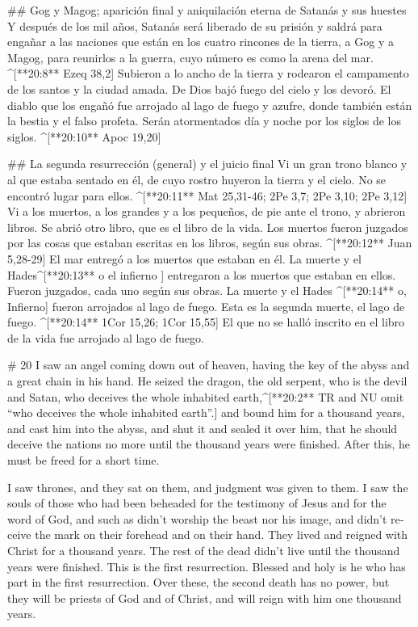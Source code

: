 \begin{paracols}{2}
## Gog y Magog; aparición final y aniquilación eterna de Satanás y sus huestes
 Y después de los mil años, Satanás será liberado de su prisión  y saldrá para engañar a las naciones que están en los cuatro rincones de la tierra, a Gog y a Magog, para reunirlos a la guerra, cuyo número es como la arena del mar. ^[**20:8** Ezeq 38,2]  Subieron a lo ancho de la tierra y rodearon el campamento de los santos y la ciudad amada. De Dios bajó fuego del cielo y los devoró.  El diablo que los engañó fue arrojado al lago de fuego y azufre, donde también están la bestia y el falso profeta. Serán atormentados día y noche por los siglos de los siglos. ^[**20:10** Apoc 19,20]

## La segunda resurrección (general) y el juicio final
 Vi un gran trono blanco y al que estaba sentado en él, de cuyo rostro huyeron la tierra y el cielo. No se encontró lugar para ellos. ^[**20:11** Mat 25,31-46; 2Pe 3,7; 2Pe 3,10; 2Pe 3,12]  Vi a los muertos, a los grandes y a los pequeños, de pie ante el trono, y abrieron libros. Se abrió otro libro, que es el libro de la vida. Los muertos fueron juzgados por las cosas que estaban escritas en los libros, según sus obras. ^[**20:12** Juan 5,28-29]  El mar entregó a los muertos que estaban en él. La muerte y el Hades^[**20:13** o el infierno ] entregaron a los muertos que estaban en ellos. Fueron juzgados, cada uno según sus obras.  La muerte y el Hades ^[**20:14** o, Infierno] fueron arrojados al lago de fuego. Esta es la segunda muerte, el lago de fuego. ^[**20:14** 1Cor 15,26; 1Cor 15,55]  El que no se halló inscrito en el libro de la vida fue arrojado al lago de fuego.

\switchcolumn
\begin{english}

# 20
 I saw an angel coming down out of heaven, having the key of the abyss and a great chain in his hand.  He seized the dragon, the old serpent, who is the devil and Satan, who deceives the whole inhabited earth,^[**20:2** TR and NU omit “who deceives the whole inhabited earth”.] and bound him for a thousand years,  and cast him into the abyss, and shut it and sealed it over him, that he should deceive the nations no more until the thousand years were finished. After this, he must be freed for a short time. 

 I saw thrones, and they sat on them, and judgment was given to them. I saw the souls of those who had been beheaded for the testimony of Jesus and for the word of God, and such as didn’t worship the beast nor his image, and didn’t receive the mark on their forehead and on their hand. They lived and reigned with Christ for a thousand years.  The rest of the dead didn’t live until the thousand years were finished. This is the first resurrection.  Blessed and holy is he who has part in the first resurrection. Over these, the second death has no power, but they will be priests of God and of Christ, and will reign with him one thousand years. 


\end{english}
\end{paracols}
